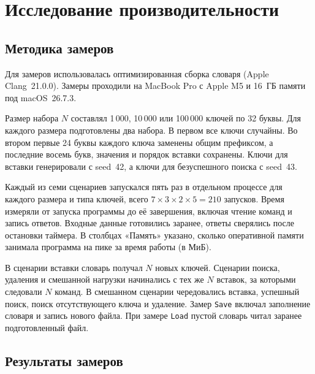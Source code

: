 \section{Исследование производительности}
\label{sec:benchmark}
\begingroup
\raggedright

\subsection{Методика замеров}

Для замеров использовалась оптимизированная сборка словаря (Apple Clang~21.0.0). Замеры проходили на MacBook Pro с Apple M5 и 16~ГБ памяти под macOS~26.7.3.

Размер набора \(N\) составлял 1\,000, 10\,000 или 100\,000 ключей по 32 буквы. Для каждого размера подготовлены два набора. В первом все ключи случайны. Во втором первые 24 буквы каждого ключа заменены общим префиксом, а последние восемь букв, значения и порядок вставки сохранены. Ключи для вставки генерировали с seed~42, а ключи для безуспешного поиска с seed~43.

Каждый из семи сценариев запускался пять раз в отдельном процессе для каждого размера и типа ключей, всего \(7 \times 3 \times 2 \times 5 = 210\) запусков. Время измеряли от запуска программы до её завершения, включая чтение команд и запись ответов. Входные данные готовились заранее, ответы сверялись после остановки таймера. В столбцах «Память» указано, сколько оперативной памяти занимала программа на пике за время работы (в МиБ).

В сценарии вставки словарь получал \(N\) новых ключей. Сценарии поиска, удаления и смешанной нагрузки начинались с тех же \(N\) вставок, за которыми следовали \(N\) команд. В смешанном сценарии чередовались вставка, успешный поиск, поиск отсутствующего ключа и удаление. Замер \texttt{Save} включал заполнение словаря и запись нового файла. При замере \texttt{Load} пустой словарь читал заранее подготовленный файл.

\subsection{Результаты замеров}

